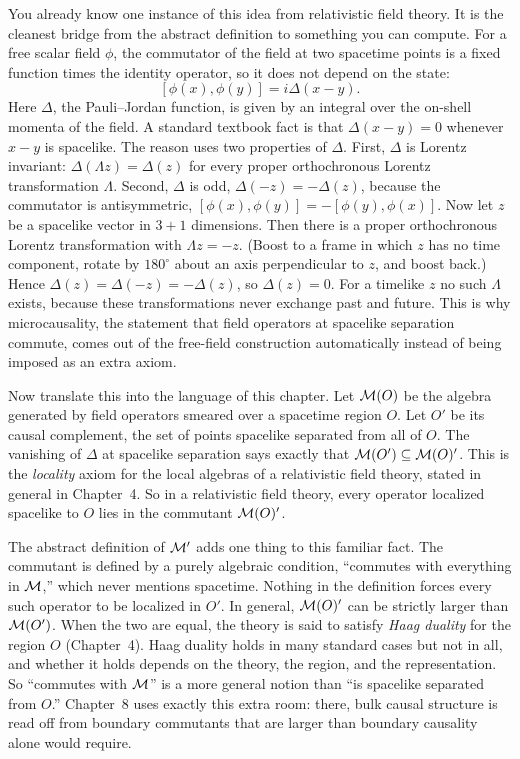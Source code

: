 \begin{physconnect}
You already know one instance of this idea from relativistic field theory. It is the cleanest bridge from
the abstract definition to something you can compute. For a free scalar field $\phi$, the commutator of the
field at two spacetime points is a fixed function times the identity operator, so it does not depend on the
state:
\[
[\phi(x),\phi(y)] = i\Delta(x-y) .
\]
Here $\Delta$, the Pauli--Jordan function, is given by an integral over the on-shell momenta of the field. A
standard textbook fact is that $\Delta(x-y)=0$ whenever $x-y$ is spacelike. The reason uses two properties of
$\Delta$. First, $\Delta$ is Lorentz invariant: $\Delta(\Lambda z)=\Delta(z)$ for every proper orthochronous
Lorentz transformation $\Lambda$. Second, $\Delta$ is odd, $\Delta(-z)=-\Delta(z)$, because the commutator is
antisymmetric, $[\phi(x),\phi(y)]=-[\phi(y),\phi(x)]$. Now let $z$ be a spacelike vector in $3+1$ dimensions.
Then there is a proper orthochronous Lorentz transformation with $\Lambda z=-z$. (Boost to a frame in which
$z$ has no time component, rotate by $180^\circ$ about an axis perpendicular to $z$, and boost back.) Hence
$\Delta(z)=\Delta(-z)=-\Delta(z)$, so $\Delta(z)=0$. For a timelike $z$ no such $\Lambda$ exists, because these
transformations never exchange past and future. This is why microcausality, the statement that field
operators at spacelike separation commute, comes out of the free-field construction automatically instead
of being imposed as an extra axiom.

Now translate this into the language of this chapter. Let $\mathcal{M}(O)$ be the algebra generated by field
operators smeared over a spacetime region $O$. Let $O'$ be its causal complement, the set of points
spacelike separated from all of $O$. The vanishing of $\Delta$ at spacelike separation says exactly that
$\mathcal{M}(O')\subseteq\mathcal{M}(O)'$. This is the \emph{locality} axiom for the local algebras of a relativistic field
theory, stated in general in Chapter~4. So in a relativistic field theory, every operator localized
spacelike to $O$ lies in the commutant $\mathcal{M}(O)'$.

The abstract definition of $\mathcal{M}'$ adds one thing to this familiar fact. The commutant is defined by a purely
algebraic condition, ``commutes with everything in $\mathcal{M}$,'' which never mentions spacetime. Nothing in the
definition forces every such operator to be localized in $O'$. In general, $\mathcal{M}(O)'$ can be strictly larger
than $\mathcal{M}(O')$. When the two are equal, the theory is said to satisfy \emph{Haag duality} for the region $O$
(Chapter~4). Haag duality holds in many standard cases but not in all, and whether it holds depends on the
theory, the region, and the representation. So ``commutes with $\mathcal{M}$'' is a more general notion than ``is
spacelike separated from $O$.'' Chapter~8 uses exactly this extra room: there, bulk causal structure is read
off from boundary commutants that are larger than boundary causality alone would require.
\end{physconnect}

